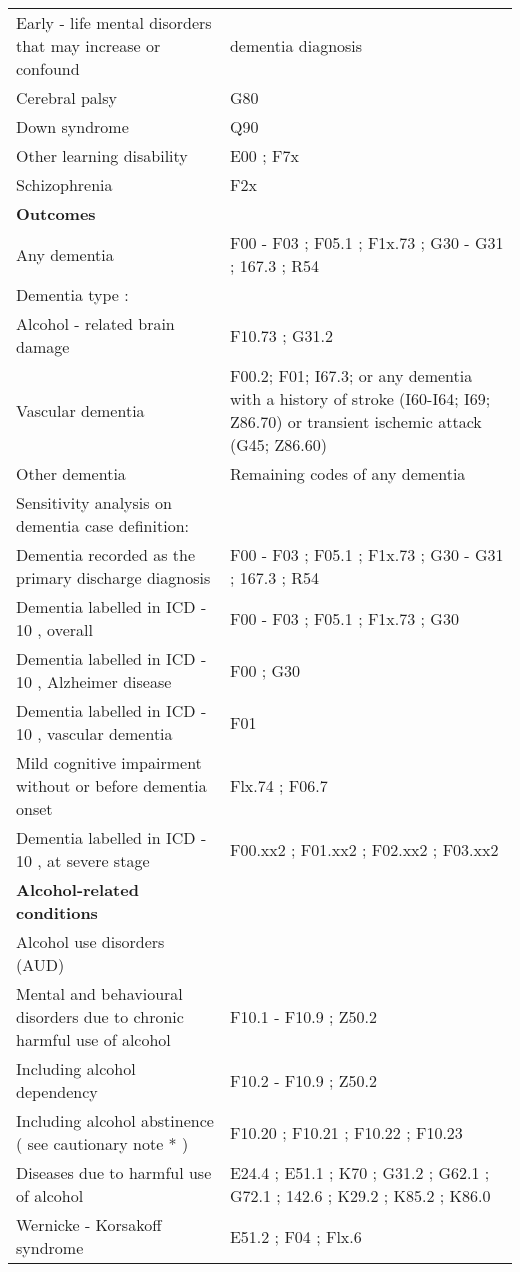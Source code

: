 \begin{longtable}[t]{>{\raggedright\arraybackslash}p{17em}>{\raggedright\arraybackslash}p{17em}}
Early - life mental disorders that may increase or confound & dementia diagnosis\\
Cerebral palsy & G80\\
\addlinespace
Down syndrome & Q90\\
Other learning disability & E00 ; F7x\\
Schizophrenia & F2x\\
\textbf{Outcomes} & \textbf{}\\
Any dementia & F00 - F03 ; F05.1 ; F1x.73 ; G30 - G31 ; 167.3 ; R54\\
\addlinespace
Dementia type : & \\
Alcohol - related brain damage & F10.73 ; G31.2\\
Vascular dementia & F00.2; F01; I67.3; or any dementia with a history of stroke (I60-I64; I69; Z86.70) or transient ischemic attack (G45; Z86.60)\\
Other dementia & Remaining codes of any dementia\\
Sensitivity analysis on dementia case definition: & \\
\addlinespace
Dementia recorded as the primary discharge diagnosis & F00 - F03 ; F05.1 ; F1x.73 ; G30 - G31 ; 167.3 ; R54\\
Dementia labelled in ICD - 10 , overall & F00 - F03 ; F05.1 ; F1x.73 ; G30\\
Dementia labelled in ICD - 10 , Alzheimer disease & F00 ; G30\\
Dementia labelled in ICD - 10 , vascular dementia & F01\\
Mild cognitive impairment without or before dementia onset & Flx.74 ; F06.7\\
\addlinespace
Dementia labelled in ICD - 10 , at severe stage & F00.xx2 ; F01.xx2 ; F02.xx2 ; F03.xx2\\
\textbf{Alcohol-related conditions} & \textbf{}\\
Alcohol use disorders (AUD) & \\
Mental and behavioural disorders due to chronic harmful use of alcohol & F10.1 - F10.9 ; Z50.2\\
Including alcohol dependency & F10.2 - F10.9 ; Z50.2\\
\addlinespace
Including alcohol abstinence ( see cautionary note * ) & F10.20 ; F10.21 ; F10.22 ; F10.23\\
Diseases due to harmful use of alcohol & E24.4 ; E51.1 ; K70 ; G31.2 ; G62.1 ; G72.1 ; 142.6 ; K29.2 ; K85.2 ; K86.0\\
Wernicke - Korsakoff syndrome & E51.2 ; F04 ; Flx.6\\

\end{longtable}
